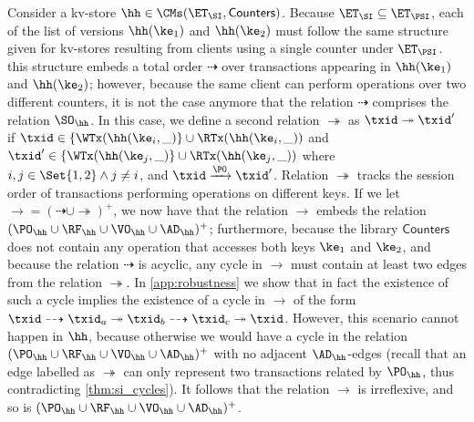 Consider a kv-store $\hh \in \CMs(\ET_{\SI}, \mathsf{Counters})$. 
Because $\ET_{\SI} \subseteq \ET_{\PSI}$, each of the list of versions $\hh(\ke_1)$ and 
$\hh(\ke_2)$ must follow the same structure given for kv-stores resulting from clients 
using a single counter under $\ET_{\PSI}$. this structure embeds a total order $\dashrightarrow$ 
over transactions appearing in $\hh(\ke_1)$ and $\hh(\ke_2)$; however, because the same 
client can perform operations over two different counters, it is not the case anymore that 
the relation $\dashrightarrow$ comprises the relation $\SO_{\hh}$. In this case, 
we define a second relation $\twoheadrightarrow$ as
$\txid \twoheadrightarrow \txid'$ if $\txid \in \{\WTx(\hh(\ke_{i}, \_)\} \cup \RTx(\hh(\ke_{i}, \_))$ 
and $\txid' \in \{\WTx(\hh(\ke_{j}, \_)\} \cup \RTx(\hh(\ke_{j}, \_))$ where $i,j \in \Set{1,2} \land j \neq i$,  
and $\txid \xrightarrow{\PO} \txid'$.
Relation $\twoheadrightarrow$ tracks the session order of transactions 
performing operations on different keys. If we let $\rightarrow = (\dashrightarrow \cup \twoheadrightarrow)^{+}$, 
we now have that the relation $\rightarrow$ embeds the relation $(\PO_{\hh} \cup \RF_{\hh} \cup 
\VO_{\hh} \cup \AD_{\hh})^{+}$; furthermore, because the library $\mathsf{Counters}$ does 
not contain any operation that accesses both keys $\ke_1$ and $\ke_2$, 
and because the relation $\dashrightarrow$ is acyclic, 
any cycle in $\rightarrow$ must contain at least two edges from the relation $\twoheadrightarrow$. 
In \cref{app:robustness} we show that in fact the existence of such a cycle implies the 
existence of a cycle in $\rightarrow$ of the form $\txid \dashrightarrow \txid_{a} \twoheadrightarrow 
\txid_{b} \dashrightarrow \txid_{c} \twoheadrightarrow \txid$. However, this scenario cannot 
happen in $\hh$, because otherwise we would have a cycle in the relation $(\PO_{\hh} \cup \RF_{\hh} 
\cup \VO_{\hh} \cup \AD_{\hh})^{+}$ with no adjacent $\AD_{\hh}$-edges (recall that an edge 
labelled as $\twoheadrightarrow$ can only  represent two transactions related by $\PO_{\hh}$, 
thus contradicting \cref{thm:si_cycles}). It follows that the relation $\rightarrow$ is irreflexive, 
and so is $(\PO_{\hh} \cup \RF_{\hh} \cup \VO_{\hh} \cup \AD_{\hh})^+$.


